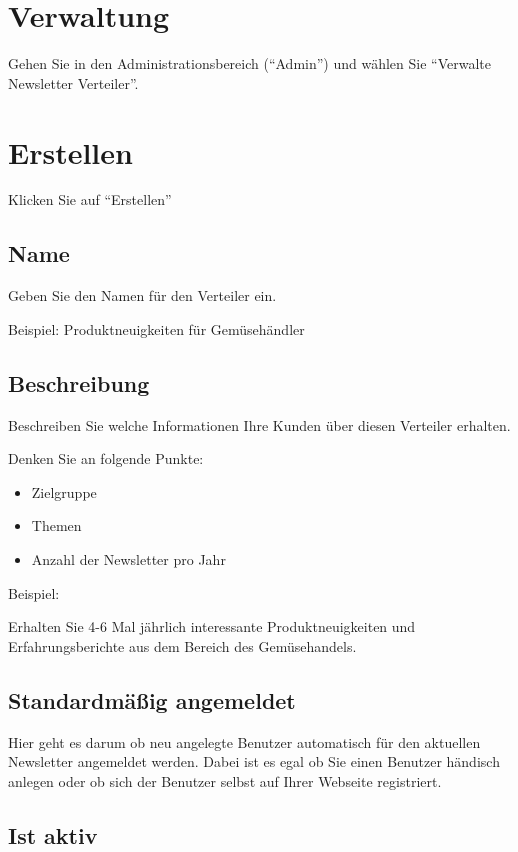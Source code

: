 \documentclass[article, a4paper, oneside, 11pt]{memoir}
\begin{document}
\section{Verwaltung}

Gehen Sie in den Administrationsbereich ("`Admin"') und wählen Sie "`Verwalte Newsletter Verteiler"'.

\section{Erstellen}
\label{sec:create-mailing-list}

Klicken Sie auf "`Erstellen"'

\subsection{Name}

Geben Sie den Namen für den Verteiler ein.

Beispiel: Produktneuigkeiten für Gemüsehändler

\subsection{Beschreibung}

Beschreiben Sie welche Informationen Ihre Kunden über diesen Verteiler erhalten.

Denken Sie an folgende Punkte:
\begin{itemize}
 \item Zielgruppe
 \item Themen
 \item Anzahl der Newsletter pro Jahr
\end{itemize}

Beispiel:  

Erhalten Sie 4-6 Mal jährlich interessante Produktneuigkeiten und Erfahrungsberichte aus dem Bereich des Gemüsehandels.

\subsection{Standardmäßig angemeldet}

Hier geht es darum ob neu angelegte Benutzer automatisch für den aktuellen Newsletter angemeldet werden.
Dabei ist es egal ob Sie einen Benutzer händisch anlegen oder ob sich der Benutzer selbst auf Ihrer Webseite registriert.

\subsection{Ist aktiv}
\end{document}
